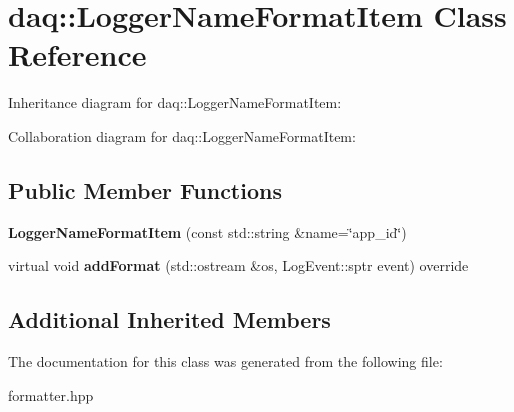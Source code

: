 \hypertarget{classdaq_1_1LoggerNameFormatItem}{}\section{daq\+:\+:Logger\+Name\+Format\+Item Class Reference}
\label{classdaq_1_1LoggerNameFormatItem}


Inheritance diagram for daq\+:\+:Logger\+Name\+Format\+Item\+:


Collaboration diagram for daq\+:\+:Logger\+Name\+Format\+Item\+:
\subsection*{Public Member Functions}
\begin{DoxyCompactItemize}
\item 
\mbox{\label{classdaq_1_1LoggerNameFormatItem_a6cb5158bcea132106941e423ab7b2f68}} 
{\bfseries Logger\+Name\+Format\+Item} (const std\+::string \&name=\char`\"{}app\+\_\+id\char`\"{})
\item 
\mbox{\label{classdaq_1_1LoggerNameFormatItem_af59c5ea408f1e1489c1374df34e6f9a8}} 
virtual void {\bfseries add\+Format} (std\+::ostream \&os, Log\+Event\+::sptr event) override
\end{DoxyCompactItemize}
\subsection*{Additional Inherited Members}


The documentation for this class was generated from the following file\+:\begin{DoxyCompactItemize}
\item 
formatter.\+hpp\end{DoxyCompactItemize}
